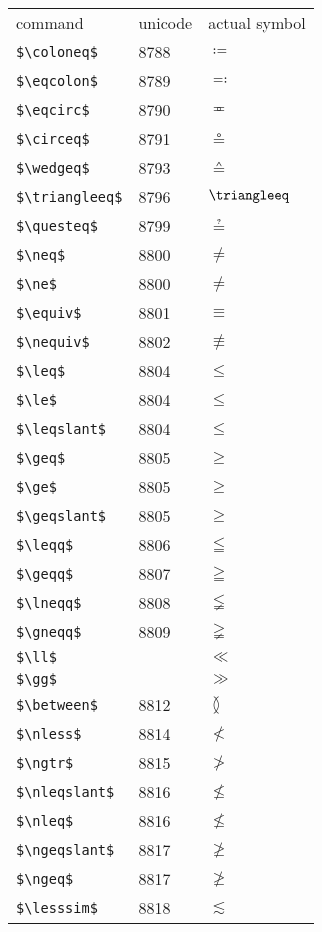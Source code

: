 \documentclass{article}
\begin{document}
\begin{table}
\begin{center}
\begin{tabular}{lll}
command & unicode & actual symbol\\
\verb#$\coloneq$# & 8788 & $\coloneq$\\ 
\verb#$\eqcolon$# & 8789 & $\eqcolon$\\ 
\verb#$\eqcirc$# & 8790 & $\eqcirc$\\ 
\verb#$\circeq$# & 8791 & $\circeq$\\ 
\verb#$\wedgeq$# & 8793 & $\wedgeq$\\ 
\verb#$\triangleeq$# & 8796 & $\triangleeq$\\ 
\verb#$\questeq$# & 8799 & $\questeq$\\ 
\verb#$\neq$# & 8800 & $\neq$\\ 
\verb#$\ne$# & 8800 & $\ne$\\ 
\verb#$\equiv$# & 8801 & $\equiv$\\ 
\verb#$\nequiv$# & 8802 & $\nequiv$\\ 
\verb#$\leq$# & 8804 & $\leq$\\ 
\verb#$\le$# & 8804 & $\le$\\ 
\verb#$\leqslant$# & 8804 & $\leqslant$\\ 
\verb#$\geq$# & 8805 & $\geq$\\ 
\verb#$\ge$# & 8805 & $\ge$\\ 
\verb#$\geqslant$# & 8805 & $\geqslant$\\ 
\verb#$\leqq$# & 8806 & $\leqq$\\ 
\verb#$\geqq$# & 8807 & $\geqq$\\ 
\verb#$\lneqq$# & 8808 & $\lneqq$\\ 
\verb#$\gneqq$# & 8809 & $\gneqq$\\ 
\verb#$\ll$# &  & $\ll$\\ 
\verb#$\gg$# &  & $\gg$\\ 
\verb#$\between$# & 8812 & $\between$\\ 
\verb#$\nless$# & 8814 & $\nless$\\ 
\verb#$\ngtr$# & 8815 & $\ngtr$\\ 
\verb#$\nleqslant$# & 8816 & $\nleqslant$\\ 
\verb#$\nleq$# & 8816 & $\nleq$\\ 
\verb#$\ngeqslant$# & 8817 & $\ngeqslant$\\ 
\verb#$\ngeq$# & 8817 & $\ngeq$\\ 
\verb#$\lesssim$# & 8818 & $\lesssim$\\ 

\end{tabular}
\end{center}
\end{table}
\end{document}
